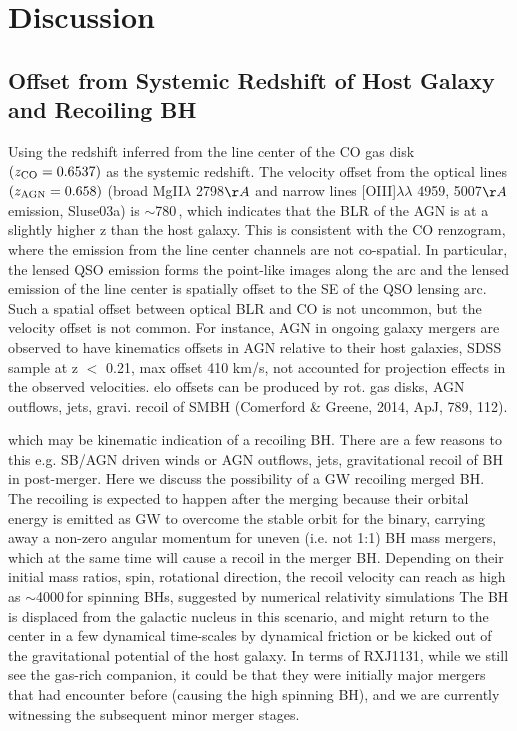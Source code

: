 \documentclass[]{emulateapj}
\begin{document}
\section{Discussion} \label{sec:diss}
\subsection{Offset from Systemic Redshift of Host Galaxy and Recoiling BH}

Using the redshift inferred from the line center of the CO gas disk
$(z_{\rm CO} = 0.6537)$ as the systemic redshift. The velocity offset from
the optical lines $(z_{\rm AGN} = 0.658)$
(broad Mg{\sc II}$\lambda$ 2798$\AA$ and narrow lines [O{\sc III}]$\lambda\lambda$ 4959, 5007$\AA$ emission, Sluse03a)
is $\sim$780\,\kms, which indicates that the
BLR of the AGN is at a slightly higher z than the host galaxy.
This is consistent with the CO renzogram, where the emission from the line center channels are not co-spatial. In particular, the lensed QSO emission forms the point-like images along the arc and the lensed emission of the line center is spatially offset to the SE of the QSO lensing arc.
Such a spatial offset between optical BLR and CO is not uncommon, but the velocity offset is not common.
For instance,
AGN in ongoing galaxy mergers are observed to have kinematics offsets in AGN relative to their host galaxies, SDSS sample at z $<$ 0.21, max offset 410 km/s, not accounted for projection effects in the observed velocities.
elo offsets can be produced by rot. gas disks, AGN outflows, jets, gravi. recoil of SMBH (Comerford \& Greene, 2014, ApJ, 789, 112).

which may be kinematic indication of a recoiling BH.
There are a few reasons to this e.g. SB/AGN driven winds or AGN outflows, jets, gravitational recoil of BH in post-merger. %
Here we discuss the possibility of a GW recoiling merged BH.
The recoiling is expected to happen after the merging because their orbital energy is emitted as GW to overcome the stable orbit for the binary,
carrying away a non-zero angular momentum for uneven (i.e. not 1:1) BH mass mergers, which at the same time will cause a recoil in the merger BH. Depending on their initial mass ratios, spin, rotational direction, the recoil velocity can reach as high as $\sim$4000\,\kms for spinning BHs, suggested by numerical relativity simulations \citep[\eg][]{Campanelli+07a}
The BH is displaced from the galactic nucleus in this scenario, and might return to the center in a few dynamical time-scales by dynamical friction or be kicked out of the gravitational potential of the host galaxy.
In terms of RXJ1131,
while we still see the gas-rich companion, it could be that they were initially major mergers that had encounter before (causing the high spinning BH), and we are currently witnessing the subsequent minor merger stages.
\end{document}
